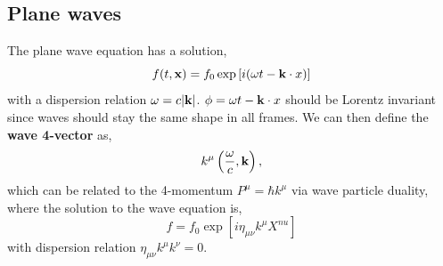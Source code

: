 \documentclass{book}
\begin{document}
\subsection{Plane waves}
The plane wave equation has a solution,
\begin{equation}
	f(t,\vb{x}) = f_0\exp\left[i(\omega t - \vb{k}\cdot{x})\right]
\end{equation}
with a dispersion relation $\omega = c|\vb{k}|$. $\phi = \omega t - \vb{k}\cdot{x}$ should be Lorentz invariant since waves should stay the same shape in all frames. We can then define the \textbf{wave 4-vector} as,
\begin{equation}
	k^{\mu} \left(\frac{\omega}{c},\vb{k}\right),
\end{equation}
which can be related to the 4-momentum $P^{\mu} = \hbar k^{\mu}$ via wave particle duality, where the solution to the wave equation is,
\begin{equation}
	f = f_0 \exp\left[i\eta_{\mu\nu}k^{\mu}X^{nu}\right]
\end{equation}
with dispersion relation $\eta_{\mu\nu}k^{\mu}k^{\nu} = 0$.
\end{document}
